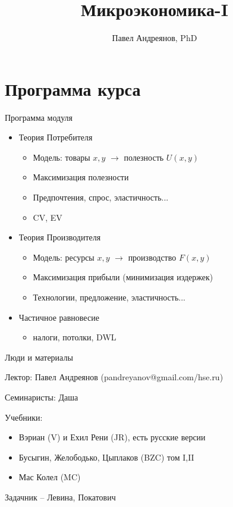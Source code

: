 \documentclass{beamer}
\title{
Микроэкономика-I
}
\author{
Павел Андреянов, PhD
}
\begin{document}
\maketitle

\section{Программа курса}

\begin{frame}{Программа модуля}
\begin{itemize}
\item Теория Потребителя
\begin{itemize}
\item Модель: товары $x, y$ $\to$ полезность $U(x,y)$
\item Максимизация полезности
\item Предпочтения, спрос, эластичность...
\item CV, EV
\end{itemize}
\item Теория Производителя
\begin{itemize}
\item Модель: ресурсы $x, y$ $\to$ производство $F(x,y)$
\item Максимизация прибыли (минимизация издержек)
\item Технологии, предложение, эластичность...
\end{itemize}
\item Частичное равновесие
\begin{itemize}
\item налоги, потолки, DWL
\end{itemize}
\end{itemize}
\end{frame}

\begin{frame}{Люди и материалы}

Лектор: Павел Андреянов (pandreyanov@gmail.com/hse.ru)

Семинаристы: Даша

Учебники:
\begin{itemize}
\item Вэриан (V) и Ехил Рени (JR), есть русские версии
\item Бусыгин, Желободько, Цыплаков (BZC) том I,II
\item Мас Колел (MC)
\end{itemize}

Задачник -- Левина, Покатович

\end{frame}
\end{document}
